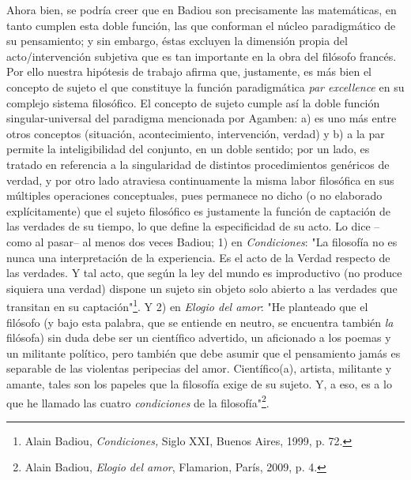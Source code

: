 \documentclass{book}
\begin{document}
Ahora bien, se podría creer que en Badiou son precisamente las
matemáticas, en tanto cumplen esta doble función, las que conforman el
núcleo paradigmático de su pensamiento; y sin embargo, éstas excluyen la
dimensión propia del acto/intervención subjetiva que es tan importante
en la obra del filósofo francés. Por ello nuestra hipótesis de trabajo
afirma que, justamente, es más bien el concepto de sujeto el que
constituye la función paradigmática \emph{par excellence} en su complejo
sistema filosófico. El concepto de sujeto cumple así la doble función
singular-universal del paradigma mencionada por Agamben: a) es uno más
entre otros conceptos (situación, acontecimiento, intervención, verdad)
y b) a la par permite la inteligibilidad del conjunto, en un doble
sentido; por un lado, es tratado en referencia a la singularidad de
distintos procedimientos genéricos de verdad, y por otro lado atraviesa
continuamente la misma labor filosófica en sus múltiples operaciones
conceptuales, pues permanece no dicho (o no elaborado explícitamente)
que el sujeto filosófico es justamente la función de captación de las
verdades de su tiempo, lo que define la especificidad de su acto. Lo
dice --como al pasar-- al menos dos veces Badiou; 1) en
\emph{Condiciones}: "La filosofía no es nunca una interpretación de la
experiencia. Es el acto de la Verdad respecto de las verdades. Y tal
acto, que según la ley del mundo es improductivo (no produce siquiera
una verdad) dispone un sujeto sin objeto solo abierto a las verdades que
transitan en su captación"\footnote{Alain Badiou, \emph{Condiciones,}
  Siglo XXI, Buenos Aires, 1999, p. 72.}. Y 2) en \emph{Elogio del
amor}: "He planteado que el filósofo (y bajo esta palabra, que se
entiende en neutro, se encuentra también \emph{la} filósofa) sin duda
debe ser un científico advertido, un aficionado a los poemas y un
militante político, pero también que debe asumir que el pensamiento
jamás es separable de las violentas peripecias del amor. Científico(a),
artista, militante y amante, tales son los papeles que la filosofía
exige de su sujeto. Y, a eso, es a lo que he llamado las cuatro
\emph{condiciones} de la filosofía"\footnote{Alain Badiou, \emph{Elogio
  del amor}, Flamarion, París, 2009, p. 4.}.
\end{document}
